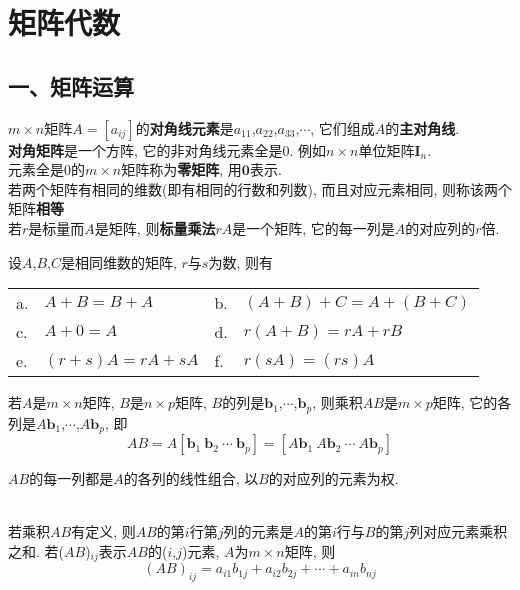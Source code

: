 \chapter{矩阵代数}
\section{一、矩阵运算}
$m\times n$矩阵$A=[a_{ij}]$的\textbf{对角线元素}是$a_{11}$,$a_{22}$,$a_{33}$,$\cdots$, 它们组成$A$的\textbf{主对角线}.\\[1ex]
\textbf{对角矩阵}是一个方阵, 它的非对角线元素全是0. 例如$n\times n$单位矩阵$\bm{I}_n$.\\[1ex]
元素全是0的$m\times n$矩阵称为\textbf{零矩阵}, 用$\bm{0}$表示.\\[1ex]
若两个矩阵有相同的维数(即有相同的行数和列数), 而且对应元素相同, 则称该两个矩阵\textbf{相等}\\[1ex]
若$r$是标量而$A$是矩阵, 则\textbf{标量乘法}$rA$是一个矩阵, 它的每一列是$A$的对应列的$r$倍.\\[2ex]

\begin{theorem}
设$A$,$B$,$C$是相同维数的矩阵, $r$与$s$为数, 则有\\
\begin{tabular}{l@{\ }l@{\hspace{5em}}l@{\ }l}
a. & $A+B=B+A$ & b. & $(A+B)+C=A+(B+C)$\\
c. & $A+0=A$ & d. & $r(A+B)=rA+rB$\\
e. & $(r+s)A=rA+sA$ & f. & $r(sA)=(rs)A$
\end{tabular}
\end{theorem}\vspace{4ex}

\begin{definition}
若$A$是$m\times n$矩阵, $B$是$n\times p$矩阵, $B$的列是$\bm{b}_1$,$\cdots$,$\bm{b}_p$, 则乘积$AB$是$m\times p$矩阵, 它的各列是$A\bm{b}_1$,$\cdots$,$A\bm{b}_p$, 即
\[AB=A[\bm{b}_1\ \bm{b}_2\ \cdots\ \bm{b}_p]=[A\bm{b}_1\ A\bm{b}_2\ \cdots\ A\bm{b}_p]\]
\end{definition}\vspace{4ex}

\begin{law}
$AB$的每一列都是$A$的各列的线性组合, 以$B$的对应列的元素为权.
\end{law}\vspace{4ex}

\begin{law}[计算$AB$的行列法则]\ \\
若乘积$AB$有定义, 则$AB$的第$i$行第$j$列的元素是$A$的第$i$行与$B$的第$j$列对应元素乘积之和. 若($AB$)${}_{ij}$表示$AB$的($i$,$j$)元素, $A$为$m\times n$矩阵, 则
\[(AB)_{ij}=a_{i1}b_{1j}+a_{i2}b_{2j}+\cdots+a_{in}b_{nj}\]
\end{law}\vspace{4ex}

